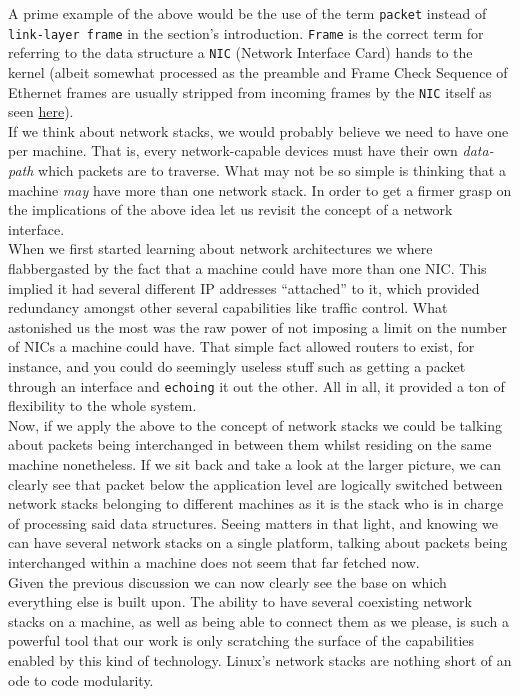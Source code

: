             A prime example of the above would be the use of the term \texttt{packet} instead of \texttt{link-layer frame} in the section's introduction. \texttt{Frame} is the correct term for referring to the data structure a \texttt{NIC} (Network Interface Card) hands to the kernel (albeit somewhat processed as the preamble and Frame Check Sequence of Ethernet frames are usually stripped from incoming frames by the \texttt{NIC} itself as seen \href{https://gitlab.com/wireshark/wireshark/-/wikis/Ethernet}{here}).\\

        If we think about network stacks, we would probably believe we need to have one per machine. That is, every network-capable devices must have their own \textit{data-path} which packets are to traverse. What may not be so simple is thinking that a machine \textit{may} have more than one network stack. In order to get a firmer grasp on the implications of the above idea let us revisit the concept of a network interface.\\

        When we first started learning about network architectures we where flabbergasted by the fact that a machine could have more than one NIC. This implied it had several different IP addresses ``attached'' to it, which provided redundancy amongst other several capabilities like traffic control. What astonished us the most was the raw power of not imposing a limit on the number of NICs a machine could have. That simple fact allowed routers to exist, for instance, and you could do seemingly useless stuff such as getting a packet through an interface and \texttt{echoing} it out the other. All in all, it provided a ton of flexibility to the whole system.\\

        Now, if we apply the above to the concept of network stacks we could be talking about packets being interchanged in between them whilst residing on the same machine nonetheless. If we sit back and take a look at the larger picture, we can clearly see that packet below the application level are logically switched between network stacks belonging to different machines as it is the stack who is in charge of processing said data structures. Seeing matters in that light, and knowing we can have several network stacks on a single platform, talking about packets being interchanged within a machine does not seem that far fetched now.\\

        Given the previous discussion we can now clearly see the base on which everything else is built upon. The ability to have several coexisting network stacks on a machine, as well as being able to connect them as we please, is such a powerful tool that our work is only scratching the surface of the capabilities enabled by this kind of technology. Linux's network stacks are nothing short of an ode to code modularity.\\

